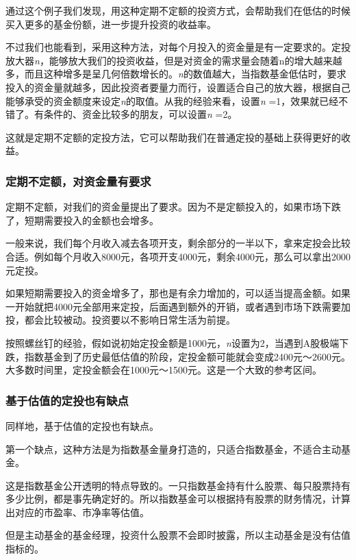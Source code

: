通过这个例子我们发现，用这种定期不定额的投资方式，会帮助我们在低估的时候买入更多的基金份额，进一步提升投资的收益率。

不过我们也能看到，采用这种方法，对每个月投入的资金量是有一定要求的。定投放大器\textit{n}，能够放大我们的投资收益，但是对资金的需求量会随着n的增大越来越多，而且这种增多是呈几何倍数增长的。\textit{n}的数值越大，当指数基金低估时，要求投入的资金量就越多，因此投资者要量力而行，设置适合自己的放大器，根据自己能够承受的资金额度来设定\textit{n}的取值。从我的经验来看，设置\textit{n} =1，效果就已经不错了。有条件的、资金比较多的朋友，可以设置\textit{n} =2。

这就是定期不定额的定投方法，它可以帮助我们在普通定投的基础上获得更好的收益。

\subsubsection{定期不定额，对资金量有要求}

定期不定额，对我们的资金量提出了要求。因为不是定额投入的，如果市场下跌了，短期需要投入的金额也会增多。

一般来说，我们每个月收入减去各项开支，剩余部分的一半以下，拿来定投会比较合适。例如每个月收入8000元，各项开支4000元，剩余4000元，那么可以拿出2000元定投。

如果短期需要投入的资金增多了，那也是有余力增加的，可以适当提高金额。如果一开始就把4000元全部用来定投，后面遇到额外的开销，或者遇到市场下跌需要加投，都会比较被动。投资要以不影响日常生活为前提。

按照螺丝钉的经验，假如说初始定投金额是1000元，\textit{n}设置为2，当遇到A股极端下跌，指数基金到了历史最低估值的阶段，定投金额可能就会变成2400元～2600元。大多数时间里，定投金额会在1000元～1500元。这是一个大致的参考区间。

\subsubsection{基于估值的定投也有缺点}

同样地，基于估值的定投也有缺点。

第一个缺点，这种方法是为指数基金量身打造的，只适合指数基金，不适合主动基金。

这是指数基金公开透明的特点导致的。一只指数基金持有什么股票、每只股票持有多少比例，都是事先确定好的。所以指数基金可以根据持有股票的财务情况，计算出对应的市盈率、市净率等估值。

但是主动基金的基金经理，投资什么股票不会即时披露，所以主动基金是没有估值指标的。

